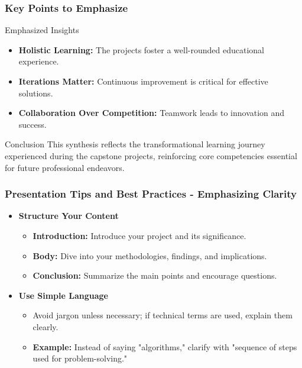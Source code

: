 \documentclass[aspectratio=169]{beamer}
\begin{document}
\begin{frame}[fragile]
  \frametitle{Key Points to Emphasize}
  \begin{block}{Emphasized Insights}
    \begin{itemize}
      \item \textbf{Holistic Learning:} The projects foster a well-rounded educational experience.
      \item \textbf{Iterations Matter:} Continuous improvement is critical for effective solutions.
      \item \textbf{Collaboration Over Competition:} Teamwork leads to innovation and success.
    \end{itemize}
  \end{block}
  
  \begin{block}{Conclusion}
    This synthesis reflects the transformational learning journey experienced during the capstone projects, reinforcing core competencies essential for future professional endeavors.
  \end{block}
\end{frame}

\begin{frame}[fragile]
    \frametitle{Presentation Tips and Best Practices - Emphasizing Clarity}
    \begin{itemize}
        \item \textbf{Structure Your Content}
        \begin{itemize}
            \item \textbf{Introduction:} Introduce your project and its significance.
            \item \textbf{Body:} Dive into your methodologies, findings, and implications.
            \item \textbf{Conclusion:} Summarize the main points and encourage questions.
        \end{itemize}
        
        \item \textbf{Use Simple Language}
        \begin{itemize}
            \item Avoid jargon unless necessary; if technical terms are used, explain them clearly.
            \item \textbf{Example:} Instead of saying "algorithms," clarify with "sequence of steps used for problem-solving."
        \end{itemize}
    \end{itemize}
\end{frame}
\end{document}
